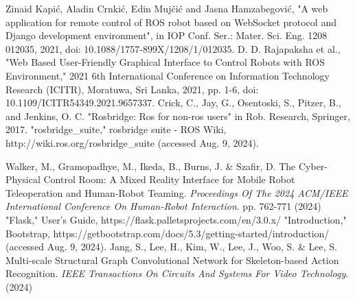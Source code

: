 \documentclass[letterpaper, 10 pt, conference]{ieeeconf}  %
\begin{document}
\begin{thebibliography}{99}
 Zinaid Kapić, Aladin Crnkić, Edin Mujčić and Jasna Hamzabegović, "A web application for remote control of ROS robot based on WebSocket protocol and Django development environment", in IOP Conf. Ser.: Mater. Sci. Eng. 1208 012035, 2021, doi: 10.1088/1757-899X/1208/1/012035.
 D. D. Rajapaksha et al., "Web Based User-Friendly Graphical Interface to Control Robots with ROS Environment," 2021 6th International Conference on Information Technology Research (ICITR), Moratuwa, Sri Lanka, 2021, pp. 1-6, doi: 10.1109/ICITR54349.2021.9657337.
 Crick, C., Jay, G., Osentoski, S., Pitzer, B., and Jenkins, O. C. "Rosbridge: Ros for non-ros users" in Rob. Research, Springer, 2017.
"rosbridge\_suite," rosbridge suite - ROS Wiki, http://wiki.ros.org/rosbridge\_suite (accessed Aug. 9, 2024).

Walker, M., Gramopadhye, M., Ikeda, B., Burns, J. \& Szafir, D. The Cyber-Physical Control Room: A Mixed Reality Interface for Mobile Robot Teleoperation and Human-Robot Teaming. {\em Proceedings Of The 2024 ACM/IEEE International Conference On Human-Robot Interaction}. pp. 762-771 (2024)
"Flask," User’s Guide, https://flask.palletsprojects.com/en/3.0.x/
"Introduction," Bootstrap, https://getbootstrap.com/docs/5.3/getting-started/introduction/ (accessed Aug. 9, 2024).
Jang, S., Lee, H., Kim, W., Lee, J., Woo, S. \& Lee, S. Multi-scale Structural Graph Convolutional Network for Skeleton-based Action Recognition. {\em IEEE Transactions On Circuits And Systems For Video Technology}. (2024)










\end{thebibliography}
\end{document}
